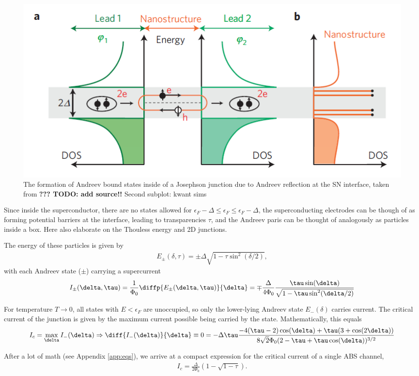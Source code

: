 \begin{figure}
	\centering
	\includegraphics[width=0.7\linewidth]{./chapter-theory/figs-JJ/KDTMK}
	\caption{The formation of Andreev bound states inside of a Josephson junction due to Andreev reflection at the SN interface, taken from \textbf{??? TODO: add source!!}
	Second subplot: kwant sims
}
	\label{fig:kdtmk}
\end{figure}

Since inside the superconductor, there are no states allowed for $\epsilon_F - \Delta \leq \epsilon_F \leq \epsilon_F - \Delta$, the superconducting electrodes can be though of as forming potential barriers at the interface, leading to transparencies $\tau$, and the Andreev paris can be thought of analogously as particles inside a box.
Here also elaborate on the Thouless energy and 2D junctions.

The energy of these particles is given by
%
\begin{eqnarray}
E_{\pm}(\delta,\tau)=\pm\Delta\sqrt{1-\tau\sin^2(\delta/2)},
\end{eqnarray}
%
with each Andreev state ($\pm$) carrying a supercurrent
%
\begin{eqnarray}
I_{\pm}(\delta,\tau)=\frac{1}{\Phi_0}\diffp{ E_{\pm}(\delta,\tau)}{\delta}=\mp\frac{\Delta}{4\Phi_0}\frac{\tau\sin(\delta)}{\sqrt{1-\tau\sin^2(\delta/2)}}
\label{eq:CPR-full}
\end{eqnarray}

For temperature $T\rightarrow0$, all states with $E<\epsilon_F$ are unoccupied, so only the lower-lying Andreev state $E_{-}(\delta)$ carries current.
%
The critical current of the junction is given by the maximum current possible being carried by the state. Mathematically, this equals
%
\begin{eqnarray}
I_c=\max_\delta I_{-}(\delta) \Rightarrow \diff{I_{-}(\delta)}{\delta}\equiv0=-\Delta\tau\frac{-4(\tau-2)\cos(\delta)+\tau(3+\cos(2\delta))}{8\sqrt{2}\Phi_0(2-\tau+\tau\cos(\delta))^{3/2}}
\label{eq:ABS-start}
\end{eqnarray}

After a lot of math (see Appendix \ref{app:eqs}), we arrive at a compact expression for the critical current of a single ABS channel,
%
\begin{eqnarray}
I_c = \frac{\Delta}{2\Phi_0}\left( 1-\sqrt{1-\tau} \right).
\label{eq:ABS-stop}
\end{eqnarray}

